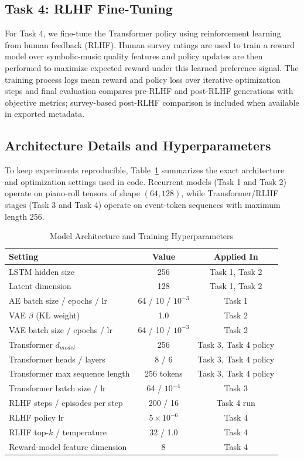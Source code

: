 \documentclass[conference]{IEEEtran}
\begin{document}
\subsection{Task 4: RLHF Fine-Tuning}
For Task 4, we fine-tune the Transformer policy using reinforcement learning from human feedback (RLHF). Human survey ratings are used to train a reward model over symbolic-music quality features and policy updates are then performed to maximize expected reward under this learned preference signal. The training process logs mean reward and policy loss over iterative optimization steps and final evaluation compares pre-RLHF and post-RLHF generations with objective metrics; survey-based post-RLHF comparison is included when available in exported metadata.

\subsection{Architecture Details and Hyperparameters}
To keep experiments reproducible, Table~\ref{tab:arch-hparams} summarizes the exact architecture and optimization settings used in code. Recurrent models (Task 1 and Task 2) operate on piano-roll tensors of shape $(64,128)$, while Transformer/RLHF stages (Task 3 and Task 4) operate on event-token sequences with maximum length 256.

\begin{table}[!t]
\caption{Model Architecture and Training Hyperparameters}
\label{tab:arch-hparams}
\begin{center}
\begin{tabular}{lcc}
\toprule
Setting & Value & Applied In \\
\midrule
LSTM hidden size & 256 & Task 1, Task 2 \\
Latent dimension & 128 & Task 1, Task 2 \\
AE batch size / epochs / lr & 64 / 10 / $10^{-3}$ & Task 1 \\
VAE $\beta$ (KL weight) & 1.0 & Task 2 \\
VAE batch size / epochs / lr & 64 / 10 / $10^{-3}$ & Task 2 \\
Transformer $d_{model}$ & 256 & Task 3, Task 4 policy \\
Transformer heads / layers & 8 / 6 & Task 3, Task 4 policy \\
Transformer max sequence length & 256 tokens & Task 3, Task 4 policy \\
Transformer batch size / lr & 64 / $10^{-4}$ & Task 3 \\
RLHF steps / episodes per step & 200 / 16 & Task 4 run \\
RLHF policy lr & $5\times10^{-6}$ & Task 4 \\
RLHF top-$k$ / temperature & 32 / 1.0 & Task 4 \\
Reward-model feature dimension & 8 & Task 4 \\
\bottomrule
\end{tabular}
\end{center}
\end{table}
\end{document}
